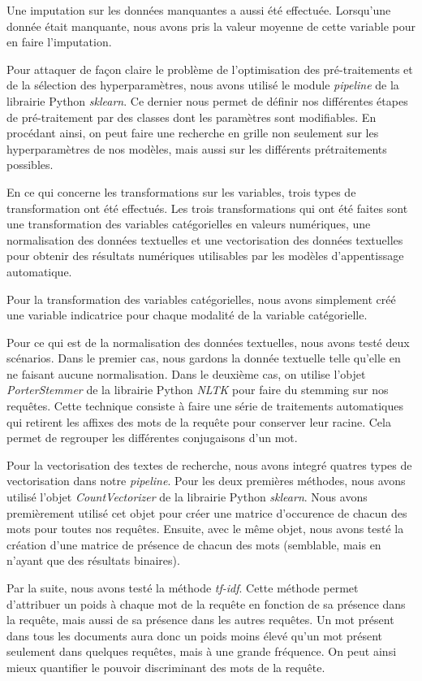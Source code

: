 Une imputation sur les données manquantes a aussi été effectuée. Lorsqu'une donnée était manquante, nous avons pris la valeur moyenne de cette variable pour en faire l'imputation.

Pour attaquer de façon claire le problème de l'optimisation des pré-traitements et de la sélection des hyperparamètres, nous avons utilisé le module \emph{pipeline} de la librairie Python \emph{sklearn}. Ce dernier nous permet de définir nos différentes étapes de pré-traitement par des classes dont les paramètres sont modifiables. En procédant ainsi, on peut faire une recherche en grille non seulement sur les hyperparamètres de nos modèles, mais aussi sur les différents prétraitements possibles.
\break

En ce qui concerne les transformations sur les variables, trois types de transformation ont été effectués.
Les trois transformations qui ont été faites sont une transformation des variables catégorielles en valeurs numériques, une normalisation des données textuelles et une vectorisation des données textuelles pour obtenir des résultats numériques utilisables par les modèles d'appentissage automatique.

Pour la transformation des variables catégorielles, nous avons simplement créé une variable indicatrice pour chaque modalité de la variable catégorielle.

Pour ce qui est de la normalisation des données textuelles, nous avons testé deux scénarios.
Dans le premier cas, nous gardons la donnée textuelle telle qu'elle en ne faisant aucune normalisation.
Dans le deuxième cas, on utilise l'objet \emph{PorterStemmer} de la librairie Python \emph{NLTK} pour faire du stemming sur nos requêtes.
Cette technique consiste à faire une série de traitements automatiques qui retirent les affixes des mots de la requête pour conserver leur racine. 
Cela permet de regrouper les différentes conjugaisons d'un mot.

Pour la vectorisation des textes de recherche, nous avons integré quatres types de vectorisation dans notre \textit{pipeline}.
Pour les deux premières méthodes, nous avons utilisé l'objet \textit{CountVectorizer} de la librairie Python \textit{sklearn}. 
Nous avons premièrement utilisé cet objet pour créer une matrice d'occurence de chacun des mots pour toutes nos requêtes.
Ensuite, avec le même objet, nous avons testé la création d'une matrice de présence de chacun des mots (semblable, mais en n'ayant que des résultats binaires).

Par la suite, nous avons testé la méthode \textit{tf-idf}. 
Cette méthode permet d'attribuer un poids à chaque mot de la requête en fonction de sa présence dans la requête, mais aussi de sa présence dans les autres requêtes. Un mot présent dans tous les documents aura donc un poids moins élevé qu'un mot présent seulement dans quelques requêtes, mais à une grande fréquence. On peut ainsi mieux quantifier le pouvoir discriminant des mots de la requête.

